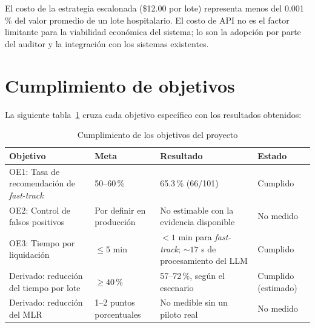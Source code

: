 El costo de la estrategia escalonada (\$12.00 por lote) representa menos del 0.001 \% del valor promedio de un lote hospitalario. El costo de API no es el factor limitante para la viabilidad económica del sistema; lo son la adopción por parte del auditor y la integración con los sistemas existentes.

\section{Cumplimiento de objetivos}

La siguiente tabla~\ref{tab:cumplimiento-objetivos} cruza cada objetivo específico con los resultados obtenidos:

\begin{table}[H]
    \centering
    \caption{Cumplimiento de los objetivos del proyecto}
    \label{tab:cumplimiento-objetivos}

    \footnotesize
    \setlength{\tabcolsep}{6pt}
    \renewcommand{\arraystretch}{1.3}

    \begin{tabular}{
        p{}
        p{}
        p{}
        p{}
    }
        \toprule
        \textbf{Objetivo}
        & \textbf{Meta}
        & \textbf{Resultado}
        & \textbf{Estado} \\
        \midrule

        OE1: Tasa de recomendación de \textit{fast-track}
        & 50--60\,\%
        & 65.3\,\% (66/101)
        & Cumplido \\

        OE2: Control de falsos positivos
        & Por definir en producción
        & No estimable con la evidencia disponible
        & No medido \\

        OE3: Tiempo por liquidación
        & $\leq 5$ min
        & $< 1$ min para \textit{fast-track};
          $\sim 17$ s de procesamiento del LLM
        & Cumplido \\

        Derivado: reducción del tiempo por lote
        & $\geq 40$\,\%
        & 57--72\,\%, según el escenario
        & Cumplido (estimado) \\

        Derivado: reducción del MLR
        & 1--2 puntos porcentuales
        & No medible sin un piloto real
        & No medido \\

        \bottomrule
    \end{tabular}
\end{table}

